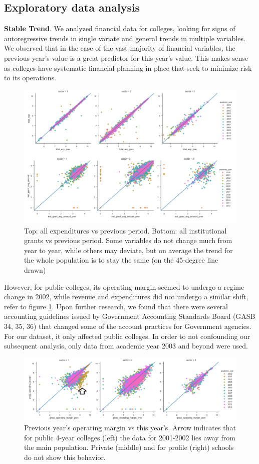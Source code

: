 \documentclass[11pt,letter]{article}
\begin{document}
\subsection{Exploratory data analysis}

{\bf{Stable Trend}}.  We analyzed financial data for colleges, looking for signs of autoregressive trends in single variate and general trends in multiple variables. We observed that in the case of the vast majority of financial variables, the previous year’s value is a great predictor for this year’s value. This makes sense as colleges have systematic financial planning in place that seek to minimize risk to its operations.
\begin{figure}[H]
\centering
\includegraphics[width=0.70\linewidth]{autoregres}
\caption{Top: all expenditures vs previous period. Bottom: all institutional grants vs previous period. Some variables do not change much from year to year, while others may deviate, but on average the trend for the whole population is to stay the same (on the 45-degree line drawn)}
\end{figure}

However, for public colleges, its operating margin seemed to undergo a regime change in 2002, while revenue and expenditures did not undergo a similar shift, refer to figure \ref{regimeswitch}. Upon further research, we found that there were several accounting guidelines issued by Government Accounting Standards Board (GASB 34, 35, 36) that changed some of the account practices for Government agencies. For our dataset, it only affected public colleges. In order to not confounding our subsequent analysis, only data from academic year 2003 and beyond were used.
\begin{figure}[H]
\centering
\includegraphics[width=\linewidth]{regime_switch.png}
\caption{ Previous year's operating margin vs this year's. Arrow indicates that for public 4-year colleges (left) the data for 2001-2002 lies away from the main population. Private (middle) and for profile (right) schools do not show this behavior.}\label{regimeswitch}
\end{figure}
\end{document}
